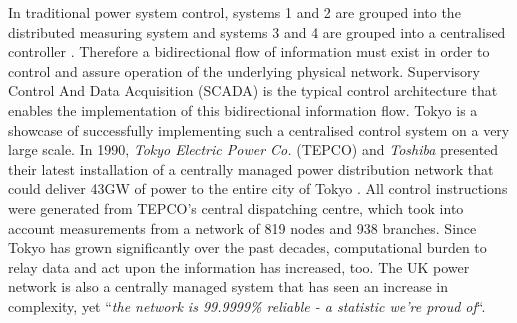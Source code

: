 
In traditional power system control, systems 1 and 2 are grouped into the distributed measuring system and systems 3 and 4 are grouped into a centralised controller \cite{Nelson1985}.
Therefore a bidirectional flow of information must exist in order to control and assure operation of the underlying physical network.
Supervisory Control And Data Acquisition (SCADA) is the typical control architecture that enables the implementation of this bidirectional information flow.
Tokyo is a showcase of successfully implementing such a centralised control system on a very large scale.
In 1990, \textit{Tokyo Electric Power Co.} (TEPCO) and \textit{Toshiba} presented their latest installation of a centrally managed power distribution network that could deliver 43GW of power to the entire city of Tokyo \cite{Matsuzawa1990}.
All control instructions were generated from TEPCO's central dispatching centre, which took into account measurements from a network of 819 nodes and 938 branches.
Since Tokyo has grown significantly over the past decades, computational burden to relay data and act upon the information has increased, too.
The UK power network is also a centrally managed system that has seen an increase in complexity, yet ``\textit{the network is 99.9999\% reliable - a statistic we're proud of}``\cite{NationalGrid2017}.


